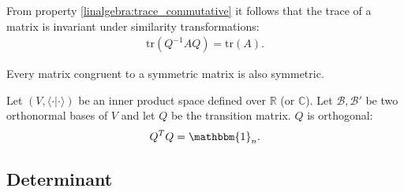     \begin{property}[Trace]
        From property \ref{linalgebra:trace_commutative} it follows that the trace of a matrix is invariant under similarity transformations:
        \begin{gather}
            \label{linalgebra:trace_invariance}
            \text{tr}(Q^{-1}AQ) = \text{tr}(A).
        \end{gather}
    \end{property}

    \begin{property}
        Every matrix congruent to a symmetric matrix is also symmetric.
    \end{property}

    \begin{property}\label{linalgebra:theorem:orthogonal_transition_matrix}
        Let $(V, \langle\cdot|\cdot\rangle)$ be an inner product space defined over $\mathbb{R}$ (or $\mathbb{C}$). Let $\mathcal{B}, \mathcal{B}'$ be two orthonormal bases of $V$ and let $Q$ be the transition matrix. $Q$ is orthogonal:
        \begin{gather}
            Q^TQ = \mathbbm{1}_n.
        \end{gather}
    \end{property}

\subsection{Determinant}

